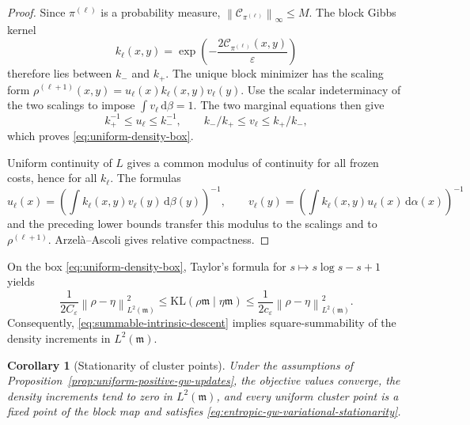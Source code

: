 \documentclass[11pt]{article}
\newtheorem{corollary}[theorem]{Corollary}
\theoremstyle{definition}
\theoremstyle{remark}
\newcommand{\Ccal}{\mathcal C}
\newcommand{\dd}{\,\mathrm d}
\newcommand{\eps}{\varepsilon}
\newcommand{\KL}{\mathrm{KL}}
\newcommand{\norm}[1]{\left\lVert #1\right\rVert}
\begin{document}
\begin{proof}
Since \(\pi^{(\ell)}\) is a probability measure,
\(\norm{\Ccal_{\pi^{(\ell)}}}_\infty\leq M\).  The block Gibbs kernel
\[
 k_\ell(x,y)
 =
 \exp\!\left(-\frac{2\Ccal_{\pi^{(\ell)}}(x,y)}{\eps}\right)
\]
therefore lies between \(k_-\) and \(k_+\).  The unique block minimizer has
the scaling form
\(
 \rho^{(\ell+1)}(x,y)=u_\ell(x)k_\ell(x,y)v_\ell(y)
\).
Use the scalar indeterminacy of the two scalings to impose
\(\int v_\ell\dd\beta=1\).  The two marginal equations then give
\[
 k_+^{-1}\leq u_\ell\leq k_-^{-1},
 \qquad
 k_-/k_+\leq v_\ell\leq k_+/k_-,
\]
which proves \eqref{eq:uniform-density-box}.

Uniform continuity of \(L\) gives a common modulus of continuity for all
frozen costs, hence for all \(k_\ell\).  The formulas
\[
 u_\ell(x)=
 \left(\int k_\ell(x,y)v_\ell(y)\dd\beta(y)\right)^{-1},
 \qquad
 v_\ell(y)=
 \left(\int k_\ell(x,y)u_\ell(x)\dd\alpha(x)\right)^{-1}
\]
and the preceding lower bounds transfer this modulus to the scalings and to
\(\rho^{(\ell+1)}\).  Arzel\`a--Ascoli gives relative compactness.
\end{proof}

On the box \eqref{eq:uniform-density-box}, Taylor's formula for
\(s\mapsto s\log s-s+1\) yields
\begin{equation}\label{eq:kl-fisher-equivalence}
 \frac1{2C_\eps}\norm{\rho-\eta}_{L^2(\mathfrak m)}^2
 \leq
 \KL(\rho\mathfrak m\mid\eta\mathfrak m)
 \leq
 \frac1{2c_\eps}\norm{\rho-\eta}_{L^2(\mathfrak m)}^2.
\end{equation}
Consequently, \eqref{eq:summable-intrinsic-descent} implies
square-summability of the density increments in \(L^2(\mathfrak m)\).

\begin{corollary}[Stationarity of cluster points]
\label{cor:stationary-gw-cluster-points}
Under the assumptions of
Proposition~\ref{prop:uniform-positive-gw-updates}, the objective values
converge, the density increments tend to zero in \(L^2(\mathfrak m)\), and
every uniform cluster point is a fixed point of the block map and satisfies
\eqref{eq:entropic-gw-variational-stationarity}.
\end{corollary}
\end{document}
